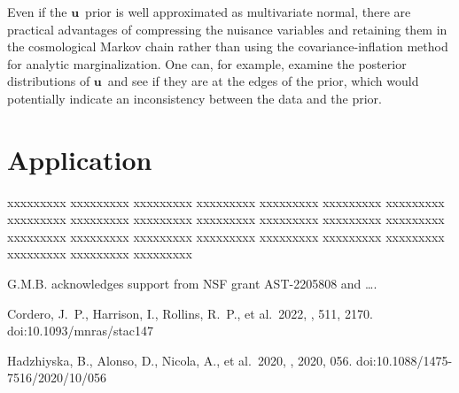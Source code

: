 \documentclass[linenumbers, onecolumn]{aastex63}
\newcommand{\vecu}{\ensuremath{\mathbf{u}}}
\begin{document}
Even if the \vecu\ prior is well approximated as multivariate normal,
there are practical advantages of compressing the nuisance 
variables and retaining them in the cosmological Markov chain rather
than using the covariance-inflation method for analytic
marginalization.  One can, for example, examine the posterior
distributions of \vecu\ and see if they are at the edges of the prior,
which would potentially indicate an inconsistency between the data and
the prior.
  

\section{Application}\label{sec:app}

xxxxxxxxx xxxxxxxxx xxxxxxxxx xxxxxxxxx xxxxxxxxx xxxxxxxxx 
xxxxxxxxx xxxxxxxxx xxxxxxxxx xxxxxxxxx xxxxxxxxx xxxxxxxxx 
xxxxxxxxx xxxxxxxxx xxxxxxxxx xxxxxxxxx xxxxxxxxx xxxxxxxxx 
xxxxxxxxx xxxxxxxxx xxxxxxxxx xxxxxxxxx xxxxxxxxx xxxxxxxxx 

  \begin{acknowledgments}


G.M.B. acknowledges support from NSF grant AST-2205808 and \ldots.

\end{acknowledgments}
\begin{thebibliography}{dummy}
%
%
 Cordero, J.~P., Harrison, I., Rollins, R.~P., et al.\ 2022, \mnras, 511, 2170. doi:10.1093/mnras/stac147

 Hadzhiyska, B., Alonso, D., Nicola, A., et al.\ 2020, \jcap, 2020, 056. doi:10.1088/1475-7516/2020/10/056
\end{thebibliography}
\end{document}
